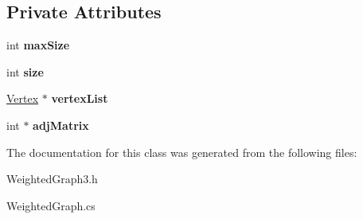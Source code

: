 \subsection*{Private Attributes}
\begin{DoxyCompactItemize}
\item 
\hypertarget{class_wt_graph_af9aaa9d6a0263b17803d8da652137ebf}{int {\bfseries max\+Size}}\label{class_wt_graph_af9aaa9d6a0263b17803d8da652137ebf}

\item 
\hypertarget{class_wt_graph_a295d3a82399a2b7d02b90779266b0ac5}{int {\bfseries size}}\label{class_wt_graph_a295d3a82399a2b7d02b90779266b0ac5}

\item 
\hypertarget{class_wt_graph_a6e99e08584fb7495542310d854d194fb}{\hyperlink{class_vertex}{Vertex} $\ast$ {\bfseries vertex\+List}}\label{class_wt_graph_a6e99e08584fb7495542310d854d194fb}

\item 
\hypertarget{class_wt_graph_a1fa6d8f87dc5c82a02e94c58a8291c09}{int $\ast$ {\bfseries adj\+Matrix}}\label{class_wt_graph_a1fa6d8f87dc5c82a02e94c58a8291c09}

\end{DoxyCompactItemize}


The documentation for this class was generated from the following files\+:\begin{DoxyCompactItemize}
\item 
Weighted\+Graph3.\+h\item 
Weighted\+Graph.\+cs\end{DoxyCompactItemize}
